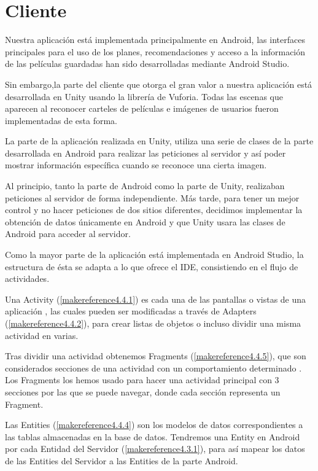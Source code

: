 \section{Cliente}
\label{makereference4.4}
Nuestra aplicación está implementada principalmente en Android, las interfaces 
principales para el uso de los planes, recomendaciones y acceso a la información 
de las películas guardadas han sido desarrolladas mediante Android Studio. 

Sin embargo,la parte del cliente que otorga el gran valor a nuestra aplicación está desarrollada 
en Unity usando la librería de Vuforia. Todas las escenas que aparecen al reconocer carteles de 
películas e imágenes de usuarios fueron implementadas de esta forma.

La parte de la aplicación realizada en Unity, utiliza una serie de clases de la 
parte desarrollada en Android para realizar las peticiones al servidor y así poder 
mostrar información específica cuando se reconoce una cierta imagen.

Al principio, tanto la parte de Android como la parte de Unity, realizaban peticiones al servidor
de forma independiente. Más tarde, para tener un mejor control y no hacer peticiones
de dos sitios diferentes, decidimos implementar la obtención 
de datos únicamente en Android y que Unity usara las clases de Android para acceder al servidor.


Como la mayor parte de la aplicación está implementada en Android Studio, 
la estructura de ésta se adapta a lo que ofrece el IDE, consistiendo en el flujo de 
actividades.

Una Activity (\autoref{makereference4.4.1}) es cada una de las pantallas o vistas de una 
aplicación \cite{activity}, las cuales pueden ser modificadas a través de Adapters 
(\autoref{makereference4.4.2}), para crear listas de objetos o incluso dividir una misma
actividad en varias. 

Tras dividir una actividad obtenemos Fragments (\autoref{makereference4.4.5}), que
son considerados secciones de una actividad con un comportamiento determinado \cite{fragment}. Los Fragments los 
hemos usado para hacer una actividad principal con 3 secciones por las que se puede navegar, 
donde cada sección representa un Fragment. 

Las Entities (\autoref{makereference4.4.4}) son los
modelos de datos correspondientes a las tablas almacenadas en la base de datos. Tendremos una Entity en Android
por cada Entidad del Servidor (\autoref{makereference4.3.1}), para así mapear los datos de las Entities del Servidor
a las Entities de la parte Android.

